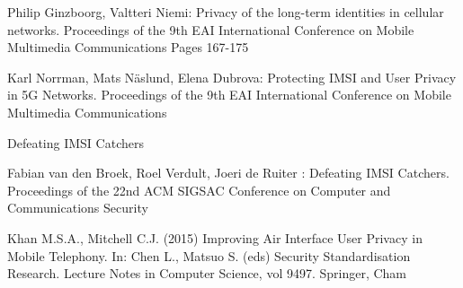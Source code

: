 \documentclass[runningheads,a4paper]{llncs} %
\begin{document}
\begin{thebibliography}{4}
 Philip Ginzboorg,  Valtteri Niemi: Privacy of the long-term identities in cellular networks. Proceedings of the 9th EAI International Conference on Mobile Multimedia Communications
Pages 167-175

 Karl Norrman, Mats N\"aslund, Elena Dubrova: Protecting IMSI and User Privacy in 5G Networks. Proceedings of the 9th EAI International Conference on Mobile Multimedia Communications

Defeating IMSI Catchers

 Fabian van den Broek, Roel Verdult, Joeri de Ruiter
: Defeating IMSI Catchers. Proceedings of the 22nd ACM SIGSAC Conference on Computer and Communications Security

 Khan M.S.A., Mitchell C.J. (2015) Improving Air Interface User Privacy in Mobile Telephony. In: Chen L., Matsuo S. (eds) Security Standardisation Research. Lecture Notes in Computer Science, vol 9497. Springer, Cham

\end{thebibliography}
\end{document}
